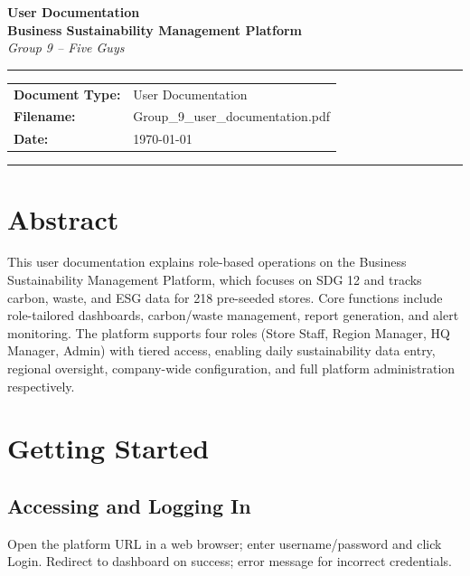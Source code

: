\documentclass[11pt,a4paper]{article}
\begin{document}
\begin{center}
{\Large \textbf{User Documentation}}\\
\vspace{0.25em}
{\large \textbf{Business Sustainability Management Platform}}\\
\vspace{0.35em}
{\small\itshape Group 9 -- Five Guys}
\end{center}

\vspace{0.25em}
\hrule
\vspace{0.25em}
{\small
\begin{tabular}{@{}ll}
\textbf{Document Type:} & User Documentation \\
\textbf{Filename:}       & Group\_9\_user\_documentation.pdf \\
\textbf{Date:}          & \today \\
\end{tabular}
}
\vspace{0.2em}
\hrule
\vspace{0.4em}
\thispagestyle{plain}
\normalsize

\section*{Abstract}
This user documentation explains role-based operations on the Business Sustainability Management Platform, which focuses on SDG 12 and tracks carbon, waste, and ESG data for 218 pre-seeded stores. Core functions include role-tailored dashboards, carbon/waste management, report generation, and alert monitoring. The platform supports four roles (Store Staff, Region Manager, HQ Manager, Admin) with tiered access, enabling daily sustainability data entry, regional oversight, company-wide configuration, and full platform administration respectively.

\section{Getting Started}

\subsection{Accessing and Logging In}
Open the platform URL in a web browser; enter username/password and click Login. Redirect to dashboard on success; error message for incorrect credentials.
\end{document}
